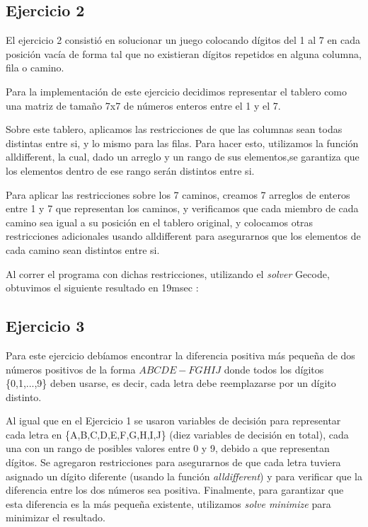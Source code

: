 \documentclass{article}
\begin{document}
\subsection{Ejercicio 2}

El ejercicio 2 consistió en solucionar un juego colocando dígitos del 1 al 7 en cada posición vacía de forma tal que no existieran dígitos repetidos en alguna columna, fila o camino.

Para la implementación de este ejercicio decidimos representar el tablero como una matriz de tamaño 7x7 de números enteros entre el 1 y el 7. \par


Sobre este tablero, aplicamos las restricciones de que las columnas sean todas distintas entre si, y lo mismo
para las filas. Para hacer esto, utilizamos la función alldifferent, la cual, dado un arreglo y un rango de sus
elementos,se garantiza que los elementos dentro de ese rango serán distintos entre si. \par


Para aplicar las restricciones sobre los 7 caminos, creamos 7 arreglos de enteros entre 1 y 7 que representan los caminos, y
verificamos que cada miembro de cada camino sea igual a su posición en el tablero original, y colocamos otras restricciones
adicionales usando alldifferent para asegurarnos que los elementos de cada camino sean distintos entre si. \par


Al correr el programa con dichas restricciones, utilizando el \textit{solver} Gecode, obtuvimos el siguiente resultado en 19msec : \par



\subsection{Ejercicio 3}

Para este ejercicio debíamos encontrar la diferencia positiva más pequeña de dos números positivos de la forma $ABCDE - FGHIJ$ donde todos los dígitos \{0,1,...,9\} deben usarse, es decir, cada letra debe reemplazarse por un dígito distinto.

Al igual que en el Ejercicio 1 se usaron variables de decisión para representar cada letra en \{A,B,C,D,E,F,G,H,I,J\} (diez variables de decisión en total), cada una con un rango de posibles valores entre 0 y 9, debido a que representan dígitos. Se agregaron restricciones para asegurarnos de que cada letra tuviera asignado un dígito diferente (usando la función \textit{alldifferent}) y para verificar que la diferencia entre los dos números sea positiva. Finalmente, para garantizar que esta diferencia es la más pequeña existente, utilizamos \textit{solve minimize} para minimizar el resultado.
\end{document}
